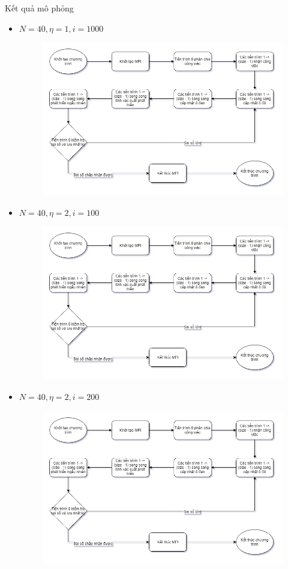 \begin{frame}[allowframebreaks]{Kết quả mô phỏng}
\begin{itemize}
\begin{figure}[H]
    \end{figure}
\end{itemize}
\break
\begin{itemize}
    \item $N = 40, \eta = 1, i = 1000$
    \begin{figure}[H]
        \centering
        \includegraphics[width=110mm]{img/algo-flowchart.png}
    \end{figure}
\end{itemize}
\break
\begin{itemize}
    \item $N = 40, \eta = 2, i = 100$
    \begin{figure}[H]
        \centering
        \includegraphics[width=110mm]{img/algo-flowchart.png}
    \end{figure}
\end{itemize}
\break
\begin{itemize}
    \item $N = 40, \eta = 2, i = 200$
    \begin{figure}[H]
        \centering
        \includegraphics[width=110mm]{img/algo-flowchart.png}

\end{figure}
\end{itemize}
\end{frame}
